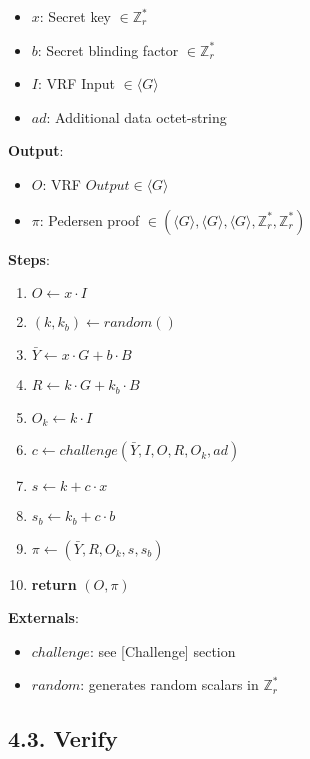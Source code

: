 \documentclass[
]{article}
\providecommand{\tightlist}{%
  \setlength{\itemsep}{0pt}\setlength{\parskip}{0pt}}
\begin{document}
\begin{itemize}
\tightlist
\item
  \(x\): Secret key \(\in \mathbb{Z}^*_r\)
\item
  \(b\): Secret blinding factor \(\in \mathbb{Z}^*_r\)
\item
  \(I\): VRF Input \(\in \langle G \rangle\)
\item
  \(ad\): Additional data octet-string
\end{itemize}

\textbf{Output}:

\begin{itemize}
\tightlist
\item
  \(O\): VRF \(Output \in \langle G \rangle\)
\item
  \(\pi\): Pedersen proof
  \(\in (\langle G \rangle, \langle G \rangle, \langle G \rangle, \mathbb{Z}^*_r, \mathbb{Z}^*_r)\)
\end{itemize}

\textbf{Steps}:

\begin{enumerate}
\def\labelenumi{\arabic{enumi}.}
\tightlist
\item
  \(O \leftarrow x \cdot I\)
\item
  \((k, k_b) \leftarrow random()\)
\item
  \(\bar{Y} \leftarrow x \cdot G + b \cdot B\)
\item
  \(R \leftarrow k \cdot G + k_b \cdot B\)
\item
  \(O_k \leftarrow k \cdot I\)
\item
  \(c \leftarrow challenge(\bar{Y}, I, O, R, O_k, ad)\)
\item
  \(s \leftarrow k + c \cdot x\)
\item
  \(s_b \leftarrow k_b + c \cdot b\)
\item
  \(\pi \leftarrow (\bar{Y}, R, O_k, s, s_b)\)
\item
  \textbf{return} \((O, \pi)\)
\end{enumerate}

\textbf{Externals}:

\begin{itemize}
\tightlist
\item
  \(challenge\): see {[}Challenge{]} section
\item
  \(random\): generates random scalars in \(\mathbb{Z}^*_r\)
\end{itemize}

\hypertarget{verify-1}{%
\subsection{4.3. Verify}\label{verify-1}}
\end{document}
